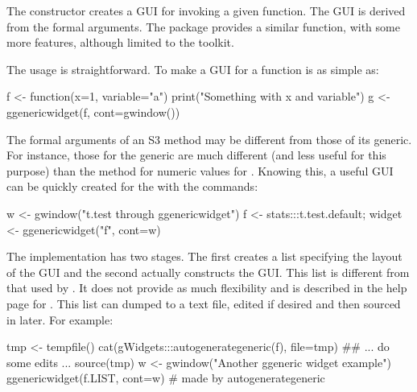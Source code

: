 The  constructor creates a GUI for
invoking a given function. The GUI is derived from the formal
arguments. The  package provides a similar function, with
some more features, although limited to the  toolkit.


The usage is straightforward. To make a GUI for a function is as
simple as:
\begin{Schunk}
\begin{Sinput}
 f <- function(x=1, variable="a") {
   print("Something with x and variable")
 }
 g <- ggenericwidget(f, cont=gwindow())
\end{Sinput}
\end{Schunk}
%
The formal arguments of an S3 method may be different from those of
its generic. For instance, those for the  generic are
much different (and less useful for this purpose) than the
 method for numeric values for . Knowing
this, a useful GUI can be quickly created for the  with
the commands:
\begin{Schunk}
\begin{Sinput}
 w <- gwindow("t.test through ggenericwidget")
 f <- stats:::t.test.default; 
 widget <- ggenericwidget("f", cont=w)
\end{Sinput}
\end{Schunk}


The implementation has two stages. The first creates a list
specifying the layout of the GUI and the second actually constructs
the GUI. This list is different from that used by . It
does not provide as much flexibility and is described in the help page
for . This list can dumped to a text file, edited if desired and then
sourced in later. For example:

\begin{Schunk}
\begin{Sinput}
 tmp <- tempfile()
 cat(gWidgets:::autogenerategeneric(f), file=tmp)
 ## ... do some edits ...
 source(tmp)
 w <- gwindow("Another ggeneric widget example")
 ggenericwidget(f.LIST, cont=w)          # made by autogenerategeneric
\end{Sinput}
\end{Schunk}










